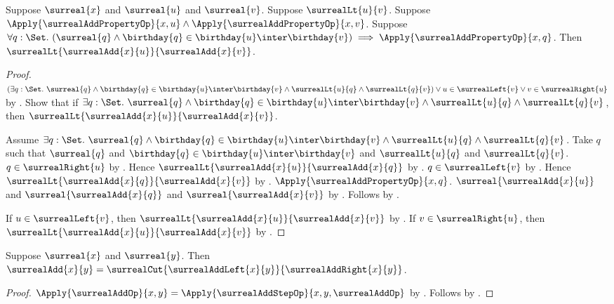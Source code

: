 \begin{lemma}\label{surreal_add_second_monotone_from_properties}
    Suppose $\surreal{x}$ and $\surreal{u}$ and $\surreal{v}$.
    Suppose $\surrealLt{u}{v}$.
    Suppose $\Apply{\surrealAddPropertyOp}{x,u}
        \land\Apply{\surrealAddPropertyOp}{x,v}$.
    Suppose $\forall q:\Set.\ (\surreal{q}\land
        \birthday{q}\in\birthday{u}\inter\birthday{v})\implies
        \Apply{\surrealAddPropertyOp}{x,q}$.
    Then $\surrealLt{\surrealAdd{x}{u}}{\surrealAdd{x}{v}}$.
\end{lemma}
\begin{proof}
    $(\exists q:\Set.\ \surreal{q}\land
            \birthday{q}\in\birthday{u}\inter\birthday{v}\land
            \surrealLt{u}{q}\land\surrealLt{q}{v})
        \lor u\in\surrealLeft{v}
        \lor v\in\surrealRight{u}$
        by .
    Show that if $\exists q:\Set.\ \surreal{q}\land
            \birthday{q}\in\birthday{u}\inter\birthday{v}\land
            \surrealLt{u}{q}\land\surrealLt{q}{v}$, then
        $\surrealLt{\surrealAdd{x}{u}}{\surrealAdd{x}{v}}$.
    \begin{subproof}
        Assume $\exists q:\Set.\ \surreal{q}\land
            \birthday{q}\in\birthday{u}\inter\birthday{v}\land
            \surrealLt{u}{q}\land\surrealLt{q}{v}$.
        Take $q$ such that $\surreal{q}$ and
            $\birthday{q}\in\birthday{u}\inter\birthday{v}$ and
            $\surrealLt{u}{q}$ and $\surrealLt{q}{v}$.
        $q\in\surrealRight{u}$
            by .
        Hence $\surrealLt{\surrealAdd{x}{u}}{\surrealAdd{x}{q}}$
            by .
        $q\in\surrealLeft{v}$
            by .
        Hence $\surrealLt{\surrealAdd{x}{q}}{\surrealAdd{x}{v}}$
            by .
        $\Apply{\surrealAddPropertyOp}{x,q}$.
        $\surreal{\surrealAdd{x}{u}}$ and
            $\surreal{\surrealAdd{x}{q}}$ and
            $\surreal{\surrealAdd{x}{v}}$
            by .
        Follows by .
    \end{subproof}
    If $u\in\surrealLeft{v}$, then
        $\surrealLt{\surrealAdd{x}{u}}{\surrealAdd{x}{v}}$
        by .
    If $v\in\surrealRight{u}$, then
        $\surrealLt{\surrealAdd{x}{u}}{\surrealAdd{x}{v}}$
        by .
\end{proof}

\begin{theorem}\label{surreal_add_equation}
    Suppose $\surreal{x}$ and $\surreal{y}$.
    Then $\surrealAdd{x}{y}=
        \surrealCut{\surrealAddLeft{x}{y}}{\surrealAddRight{x}{y}}$.
\end{theorem}
\begin{proof}
    $\Apply{\surrealAddOp}{x,y}
        =\Apply{\surrealAddStepOp}
            {x,y,\surrealAddOp}$
        by .
    Follows by
        .
\end{proof}

